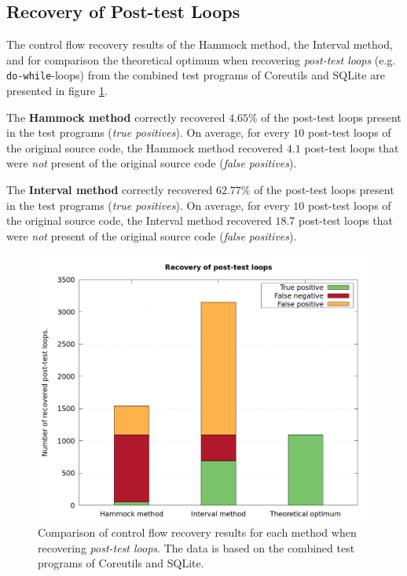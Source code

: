 
\subsection{Recovery of Post-test Loops}
\label{sec:recovery_of_post_test_loops}

The control flow recovery results of the Hammock method, the Interval method, and for comparison the theoretical optimum when recovering \textit{post-test loops} (e.g. \texttt{do-while}-loops) from the combined test programs of Coreutils and SQLite are presented in figure \ref{fig:total_results_post_loop}.

The \textbf{Hammock method} correctly recovered $4.65\%$ of the post-test loops present in the test programs (\textit{true positives}). On average, for every $10$ post-test loops of the original source code, the Hammock method recovered $4.1$ post-test loops that were \textit{not} present of the original source code (\textit{false positives}).

The \textbf{Interval method} correctly recovered $62.77\%$ of the post-test loops present in the test programs (\textit{true positives}). On average, for every $10$ post-test loops of the original source code, the Interval method recovered $18.7$ post-test loops that were \textit{not} present of the original source code (\textit{false positives}).

\begin{figure}[htbp]
	\centering
	\includegraphics[width=\textwidth]{inc/5_results/results_post_loop.png}
	\caption{Comparison of control flow recovery results for each method when recovering \textit{post-test loops}. The data is based on the combined test programs of Coreutils and SQLite.}
	\label{fig:total_results_post_loop}
\end{figure}
